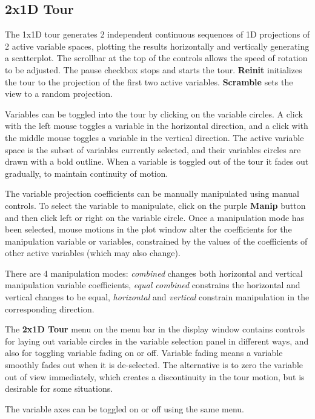 \documentclass[11pt]{article}
\def\Widget#1{\textbf{#1}}
\begin{document}
\subsection{2x1D Tour}
\label{slbl:2x1DTour}

The 1x1D tour generates 2 independent continuous sequences of 1D
projections of 2 active variable spaces, plotting the results
horizontally and vertically generating a scatterplot. The scrollbar at
the top of the controls allows the speed of rotation to be
adjusted. The pause checkbox stops and starts the tour. \Widget{Reinit}
initializes the tour to the projection of the first two active
variables. \Widget{Scramble} sets the view to a random projection.

Variables can be toggled into the tour by clicking on the variable
circles. A click with the left mouse toggles a variable in the horizontal
direction, and a click with the middle mouse toggles a variable in
the vertical direction. The active variable space is the subset of
variables currently selected, and their variables circles are drawn with
a bold outline. When a variable is toggled out of the tour it fades out
gradually, to maintain continuity of motion.

The variable projection coefficients can be manually manipulated using
manual controls. To select the variable to manipulate, click on the purple
\Widget{Manip} button and then click left or right on the variable circle.
Once a manipulation mode has been selected, mouse motions in the plot
window alter the coefficients for the manipulation variable or variables,
constrained by the values of the coefficients of other active variables
(which may also change).

There are 4 manipulation modes: {\it combined} changes both horizontal
and vertical manipulation variable coefficients, {\it equal combined}
constrains the horizontal and vertical changes to be equal, {\it
horizontal} and {\it vertical} constrain manipulation in the corresponding
direction.

The \Widget{2x1D Tour} menu on the menu bar in the display window
contains controls for laying out variable circles in the variable
selection panel in different ways, and also for toggling variable
fading on or off. Variable fading means a variable smoothly fades out
when it is de-selected. The alternative is to zero the variable out of
view immediately, which creates a discontinuity in the tour motion,
but is desirable for some situations.

The variable axes can be toggled on or off using the same menu.
\end{document}
